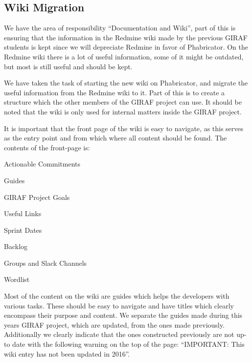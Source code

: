 \subsection{Wiki Migration}
We have the area of responsibility ``Documentation and Wiki'', part of this is ensuring that the information in the Redmine wiki made by the previous GIRAF students is kept since we will depreciate Redmine in favor of Phabricator.
On the Redmine wiki there is a lot of useful information, some of it might be outdated, but most is still useful and should be kept. 

We have taken the task of starting the new wiki on Phabricator, and migrate the useful information from the Redmine wiki to it.
Part of this is to create a structure which the other members of the GIRAF project can use.
It should be noted that the wiki is only used for internal matters inside the GIRAF project.  

It is important that the front page of the wiki is easy to navigate, as this serves as the entry point and from which where all content should be found. 
The contents of the front-page is:

\begin{multicols}{2}
\begin{enumberate}
    \item Actionable Commitments
    \item Guides
    \item GIRAF Project Goals
    \item Useful Links
    \item Sprint Dates
    \item Backlog
    \item Groups and Slack Channels
    \item Wordlist
\end{enumberate}
\end{multicols}

Most of the content on the wiki are guides which helps the developers with various tasks. 
These should be easy to navigate and have titles which clearly encompass their purpose and content. 
We separate the guides made during this years GIRAF project, which are updated, from the ones made previously. 
Additionally we clearly indicate that the ones constructed previously are not up-to date with the following warning on the top of the page: ``IMPORTANT: This wiki entry has not been updated in 2016''. 

